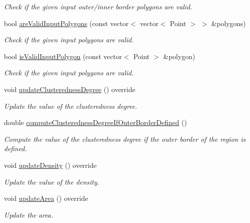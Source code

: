 \begin{DoxyCompactItemize}
\begin{DoxyCompactList}\small\item\em Check if the given input outer/inner border polygons are valid. \end{DoxyCompactList}\item 
bool \hyperlink{classmultiscale_1_1analysis_1_1Region_a4d5a2b591c82909d6a49d06fe452cced}{are\-Valid\-Input\-Polygons} (const vector$<$ vector$<$ Point $>$ $>$ \&polygons)
\begin{DoxyCompactList}\small\item\em Check if the given input polygons are valid. \end{DoxyCompactList}\item 
bool \hyperlink{classmultiscale_1_1analysis_1_1Region_a8a97c4d8296a6e254a131c63ccb18cf1}{is\-Valid\-Input\-Polygon} (const vector$<$ Point $>$ \&polygon)
\begin{DoxyCompactList}\small\item\em Check if the given input polygons are valid. \end{DoxyCompactList}\item 
void \hyperlink{classmultiscale_1_1analysis_1_1Region_a35c88944e2704571214b6e28dd657350}{update\-Clusteredness\-Degree} () override
\begin{DoxyCompactList}\small\item\em Update the value of the clusteredness degree. \end{DoxyCompactList}\item 
double \hyperlink{classmultiscale_1_1analysis_1_1Region_a330d1dcf6d74faab5a2e7f4e7b57278d}{compute\-Clusteredness\-Degree\-If\-Outer\-Border\-Defined} ()
\begin{DoxyCompactList}\small\item\em Compute the value of the clusteredness degree if the outer border of the region is defined. \end{DoxyCompactList}\item 
void \hyperlink{classmultiscale_1_1analysis_1_1Region_a995bd4ac0452715ec75bdb8c6ae51914}{update\-Density} () override
\begin{DoxyCompactList}\small\item\em Update the value of the density. \end{DoxyCompactList}\item 
void \hyperlink{classmultiscale_1_1analysis_1_1Region_a88adaf10fae7c554581498f86f1863fa}{update\-Area} () override
\begin{DoxyCompactList}\small\item\em Update the area. \end{DoxyCompactList}\item 

\end{DoxyCompactItemize}
